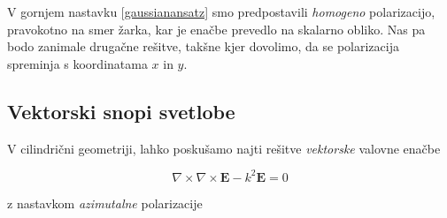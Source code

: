 \documentclass[longbibliography,slovene,a4paper,12pt]{book}
\begin{document}
V gornjem nastavku \ref{gaussianansatz} smo predpostavili \emph{homogeno} polarizacijo, pravokotno na smer žarka, kar je enačbe prevedlo na skalarno obliko. Nas pa bodo zanimale drugačne rešitve, takšne kjer dovolimo, da se polarizacija spreminja s koordinatama $x$ in $y$.

\subsection{Vektorski snopi svetlobe}

V cilindrični geometriji, lahko poskušamo najti rešitve \emph{vektorske} valovne enačbe

\begin{equation}
\nabla \times \nabla \times \mathbf{E} - k^2 \mathbf{E} = 0
\end{equation}

z nastavkom \emph{azimutalne} polarizacije 
\end{document}
